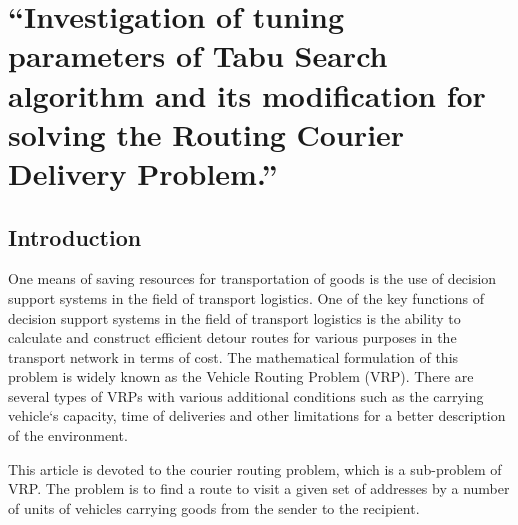 \documentclass[]{TAACpaper}
\begin{document}

\def\dd#1#2{\frac{\partial#1}{\partial#2}}
\section{
``Investigation of tuning parameters of Tabu Search algorithm and its modification  for solving the Routing Courier Delivery Problem.''
}



\subsection{Introduction}
One means of saving resources for transportation of goods is the use of decision support systems in the field of transport logistics. One of the key functions of decision support systems in the field of transport logistics is the ability to calculate and construct efficient detour routes for various purposes in the transport network in terms of cost. The mathematical formulation of this problem is widely known as the Vehicle Routing Problem (VRP). There are several types of VRPs with various additional conditions such as the carrying vehicle`s capacity, time of deliveries and other limitations for a better description of the environment.

This article is devoted to the courier routing problem, which is a sub-problem of VRP. The problem is to find a route to visit a given set of addresses by a number of units of vehicles carrying goods from the sender to the recipient.
\end{document}
